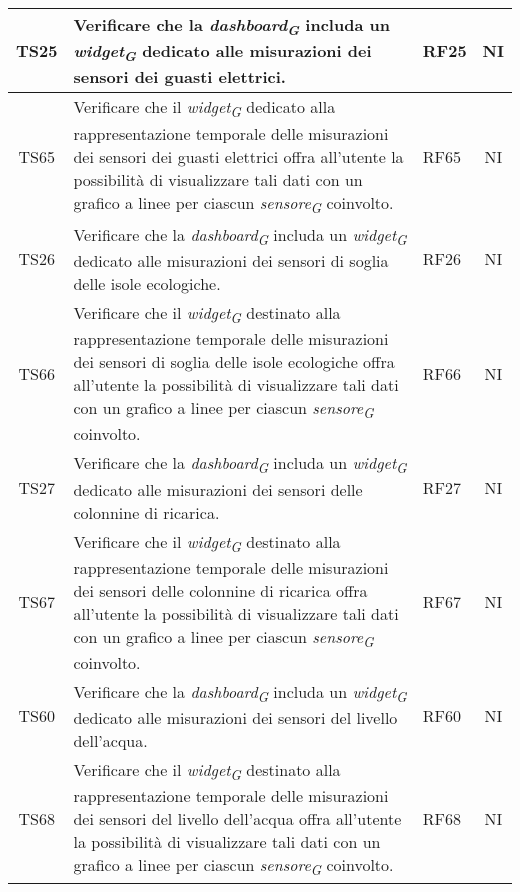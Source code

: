 \begin{longtable}{|c|p{5cm}|>{\raggedright}p{2cm}|c|}
        \hline
        TS25 & Verificare che la \textit{dashboard}\textsubscript{\textit{G}} includa un \textit{widget}\textsubscript{\textit{G}} dedicato alle misurazioni dei sensori dei guasti elettrici. & RF25 & NI \\
        \hline
        TS65 & Verificare che il \textit{widget}\textsubscript{\textit{G}} dedicato alla rappresentazione temporale delle misurazioni dei sensori dei guasti elettrici offra all'utente la possibilità di visualizzare tali dati con un grafico a linee per ciascun \textit{sensore}\textsubscript{\textit{G}} coinvolto. & RF65 & NI \\
        \hline
        TS26 & Verificare che la \textit{dashboard}\textsubscript{\textit{G}} includa un \textit{widget}\textsubscript{\textit{G}} dedicato alle misurazioni dei sensori di soglia delle isole ecologiche. & RF26 & NI \\
        \hline
        TS66 & Verificare che il \textit{widget}\textsubscript{\textit{G}} destinato alla rappresentazione temporale delle misurazioni dei sensori di soglia delle isole ecologiche offra all'utente la possibilità di visualizzare tali dati con un grafico a linee per ciascun \textit{sensore}\textsubscript{\textit{G}} coinvolto. & RF66 & NI \\
        \hline
        TS27 & Verificare che la \textit{dashboard}\textsubscript{\textit{G}} includa un \textit{widget}\textsubscript{\textit{G}} dedicato alle misurazioni dei sensori delle colonnine di ricarica. & RF27 & NI \\
        \hline
        TS67 & Verificare che il \textit{widget}\textsubscript{\textit{G}} destinato alla rappresentazione temporale delle misurazioni dei sensori delle colonnine di ricarica offra all'utente la possibilità di visualizzare tali dati con un grafico a linee per ciascun \textit{sensore}\textsubscript{\textit{G}} coinvolto. & RF67 & NI \\
        \hline
        TS60 & Verificare che la \textit{dashboard}\textsubscript{\textit{G}} includa un \textit{widget}\textsubscript{\textit{G}} dedicato alle misurazioni dei sensori del livello dell'acqua. & RF60 & NI \\
        \hline
        TS68 & Verificare che il \textit{widget}\textsubscript{\textit{G}} destinato alla rappresentazione temporale delle misurazioni dei sensori del livello dell'acqua offra all'utente la possibilità di visualizzare tali dati con un grafico a linee per ciascun \textit{sensore}\textsubscript{\textit{G}} coinvolto. & RF68 & NI \\

\end{longtable}
